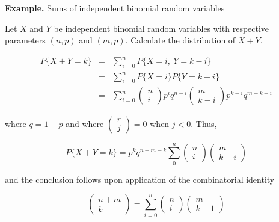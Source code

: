 \textbf{Example.} Sums of independent binomial random variables

Let $X$ and $Y$ be independent binomial random variables with respective parameters $(n,p)$ and $(m,p)$. Calculate the distribution of $X + Y$.

\begin{solution}
	\begin{eqnarray*}
		P \{X + Y = k\} &=& \sum^n_{i = 0}P\{X = i,~Y = k - i\}\\
		&=& \sum^n_{i = 0}P\{X = i\}P\{Y = k - i\}\\
		&=&\sum^n_{i = 0}\left(\begin{matrix}
			n \\ i
		\end{matrix}\right) p^iq^{n - i} \left( \begin{matrix}
			m \\ k - i
		\end{matrix} \right) p^{k - i}q^{m - k + i}
	\end{eqnarray*}
	
	where $q = 1 - p$ and where $\left( \begin{matrix}
		r \\ j
	\end{matrix} \right) = 0$ when $j < 0$. Thus,
	
	$$P\{X + Y = k\} = p^kq^{n + m-k} \sum^n_0\left( \begin{matrix}
		n \\ i
	\end{matrix} \right) \left( \begin{matrix}
		m \\ k - i
	\end{matrix}\right)$$
	
	and the conclusion follows upon application of the combinatorial identity
	
	$$\left( \begin{matrix}
		n + m \\ k
	\end{matrix}\right) = \sum^n_{i = 0} \left( \begin{matrix}
		n \\ i
	\end{matrix} \right) \left( \begin{matrix}
		m \\ k-1
	\end{matrix}\right)$$
\end{solution}

\newpage


